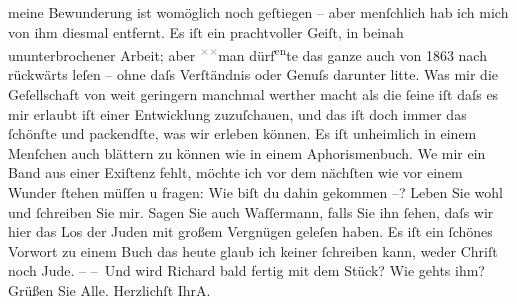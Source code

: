 \begin{ledgroupsized}[t]{13cm}
               meine Bewunderung ist womöglich noch geſtiegen – aber menſchlich hab ich mich von ihm
               diesmal entfernt. Es iſt ein prachtvoller Geiſt, in beinah ununterbrochener Arbeit;
               aber \substVorne{}\textsuperscript{\textcolor{gray}{×}\-\textcolor{gray}{×}}\substDazwischen{}man\substHinten{} dürf\substVorne{}\textsuperscript{en}\substDazwischen{}te\substHinten{} das ganze auch von 1863 nach rückwärts leſen – ohne daſs
               Verſtändnis {\pb}oder Genuſs darunter litte. Was mir die
               Geſellschaft von weit geringern \introOben{}manchmal\introOben{} werther macht als
               die ſeine iſt daſs es mir erlaubt iſt einer Entwicklung zuzuſchauen, und das iſt doch
               immer das ſchönſte und packendſte, was wir erleben können. Es iſt unheimlich in einem
               Menſchen auch blättern zu können wie in einem Aphorismenbuch. We{\geminationn} mir ein Band aus einer Exiſtenz fehlt, möchte ich vor
                  {\pb}dem nächſten wie vor einem Wunder ſtehen müſſen u
               fragen: Wie biſt du dahin gekommen –?\pend
           \pstart
           Leben Sie wohl und ſchreiben Sie mir.\pend
           \pstart
           Sagen Sie auch Waſſermann, falls Sie ihn ſehen,
               daſs wir hier das Los der Juden mit großem
               Vergnügen geleſen haben. Es iſt ein ſchönes Vorwort zu einem Buch das heute glaub ich
               keiner ſchreiben kann, weder Chriſt noch Jude. –\pend
           \pstart
           – Und wird Richard bald {\pb}fertig mit dem Stück? Wie gehts ihm?\pend
           \pstart
            Grüßen Sie Alle.\pend
           \pstart Herzlichſt Ihr\spacefill\mbox{A.}\pend{}\endnumbering{}\end{ledgroupsized}  \newcommand{\dateiname}{L01424}\newcommand{\titel}{Arthur Schnitzler an Hugo von Hofmannsthal, 9. 8. 1904}\newcommand{\editorInnen}{ Martin Anton Müller und Gerd-Hermann Susen}
            \footnotesize
\begin{ledgroupsized}[t]{11.5cm}
\end{ledgroupsized}
         
      